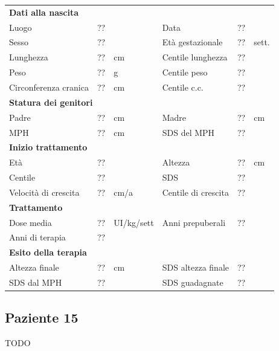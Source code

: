 \begin{table}[!h]
\begin{tabular}{lrllrl}
\toprule
\multicolumn{6}{l}{\textbf{Dati alla nascita}}\\
Luogo 		& \multicolumn{2}{l}{??} 	& Data 					& \multicolumn{2}{l}{??} 	\\
Sesso 		& \multicolumn{2}{l}{??} 	& Età gestazionale 		& ?? 		& sett.\\
Lunghezza 	& ?? 		& cm 				& Centile lunghezza		& ?? 		\\
Peso 		& ?? 		& g					& Centile peso			& ?? 		\\
Circonferenza cranica	& ?? 		& cm 	& Centile c.c.			& ?? \\
\midrule
\multicolumn{6}{l}{\textbf{Statura dei genitori}}\\
Padre 		& ?? & cm 	& Madre 				& ?? & cm \\
MPH 		& ?? & cm 	& SDS del MPH 			& ??\\
\midrule
\multicolumn{6}{l}{\textbf{Inizio trattamento}} \\
Età	& ?? & 		& Altezza 				& ?? & cm  \\
Centile & ?? 	 &		& SDS		& ?? \\
Velocità di crescita & ?? & cm/a	& Centile di crescita & ??\\
\midrule
\multicolumn{6}{l}{\textbf{Trattamento}} \\
Dose media		& ?? & UI/kg/sett & Anni prepuberali & ??\\
Anni di terapia & ??\\
\midrule
\multicolumn{6}{l}{\textbf{Esito della terapia}} \\
Altezza finale			& ?? & cm 	& SDS altezza finale		& ??\\
SDS dal MPH				& ?? &		& SDS guadagnate 			& ??\\
\bottomrule
\end{tabular}
\end{table}
\clearpage


\subsection*{Paziente 15}

TODO

